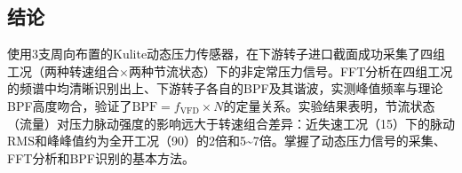 \subsection{结论}

使用3支周向布置的Kulite动态压力传感器，在下游转子进口截面成功采集了四组工况（两种转速组合$\times$两种节流状态）下的非定常压力信号。FFT分析在四组工况的频谱中均清晰识别出上、下游转子各自的BPF及其谐波，实测峰值频率与理论BPF高度吻合，验证了$\text{BPF} = f_{\text{VFD}} \times N$的定量关系。实验结果表明，节流状态（流量）对压力脉动强度的影响远大于转速组合差异：近失速工况（15\textdegree{}）下的脉动RMS和峰峰值约为全开工况（90\textdegree{}）的2倍和5\textasciitilde7倍。掌握了动态压力信号的采集、FFT分析和BPF识别的基本方法。
